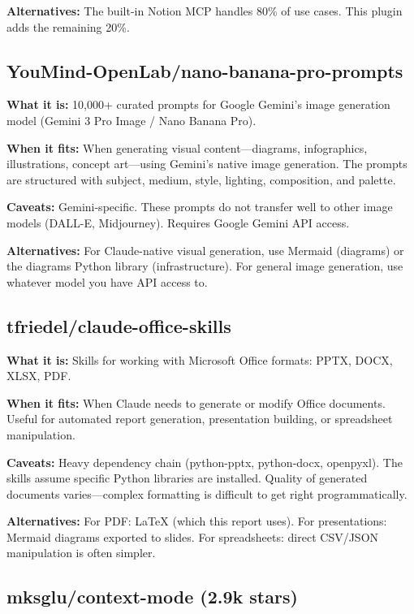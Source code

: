 \documentclass[11pt,a4paper]{article}
\begin{document}
\textbf{Alternatives:} The built-in Notion MCP handles 80\% of use cases. This plugin adds the remaining 20\%.

\subsection{YouMind-OpenLab/nano-banana-pro-prompts}

\textbf{What it is:} 10,000+ curated prompts for Google Gemini's image generation model (Gemini 3 Pro Image / Nano Banana Pro).

\textbf{When it fits:} When generating visual content---diagrams, infographics, illustrations, concept art---using Gemini's native image generation. The prompts are structured with subject, medium, style, lighting, composition, and palette.

\textbf{Caveats:} Gemini-specific. These prompts do not transfer well to other image models (DALL-E, Midjourney). Requires Google Gemini API access.

\textbf{Alternatives:} For Claude-native visual generation, use Mermaid (diagrams) or the diagrams Python library (infrastructure). For general image generation, use whatever model you have API access to.

\subsection{tfriedel/claude-office-skills}

\textbf{What it is:} Skills for working with Microsoft Office formats: PPTX, DOCX, XLSX, PDF.

\textbf{When it fits:} When Claude needs to generate or modify Office documents. Useful for automated report generation, presentation building, or spreadsheet manipulation.

\textbf{Caveats:} Heavy dependency chain (python-pptx, python-docx, openpyxl). The skills assume specific Python libraries are installed. Quality of generated documents varies---complex formatting is difficult to get right programmatically.

\textbf{Alternatives:} For PDF: LaTeX (which this report uses). For presentations: Mermaid diagrams exported to slides. For spreadsheets: direct CSV/JSON manipulation is often simpler.

\subsection{mksglu/context-mode (2.9k stars)}
\end{document}
